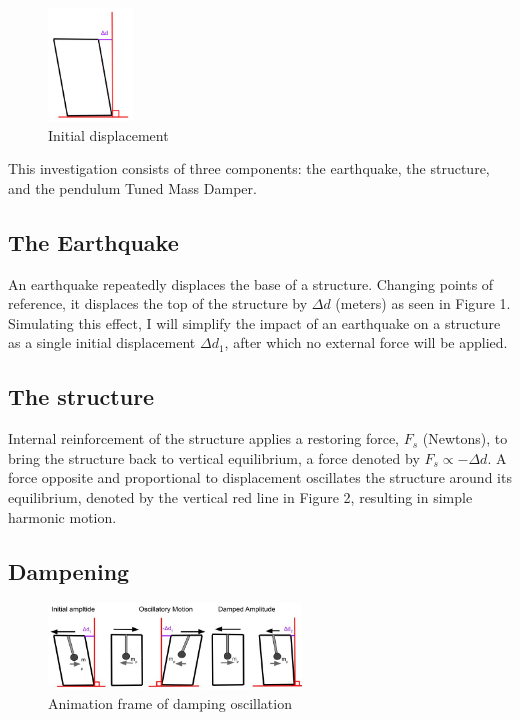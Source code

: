 \documentclass[11pt]{article}
\begin{document}
\begin{figure}
\vspace{-15pt}
\centering
\includegraphics[width=0.2\textwidth]{img/fig1.jpg}
\caption{\label{fig:1}Initial displacement}
\vspace{-50pt}
\end{figure}

This investigation consists of three components: the earthquake, the structure, and the pendulum Tuned Mass Damper.

\subsection{The Earthquake}

An earthquake repeatedly displaces the base of a structure. Changing points of reference, it displaces the top of the structure by $\Delta d$ (meters) as seen in Figure 1. Simulating this effect, I will simplify the impact of an earthquake on a structure as a single initial displacement $\Delta d_1$, after which no external force will be applied.


\subsection{The structure}

Internal reinforcement of the structure applies a restoring force, $F_s$ (Newtons), to bring the structure back to vertical equilibrium, a force denoted by $F_s \propto -\Delta d$. A force opposite and proportional to displacement oscillates the structure around its equilibrium, denoted by the vertical red line in Figure 2, resulting in simple harmonic motion.



\subsection{Dampening}

\begin{figure}
\centering
\includegraphics[width=0.6\textwidth]{img/fig2.jpg}
\caption{\label{fig:2}Animation frame of damping oscillation}
\vspace{-10pt}
\end{figure}
\end{document}
